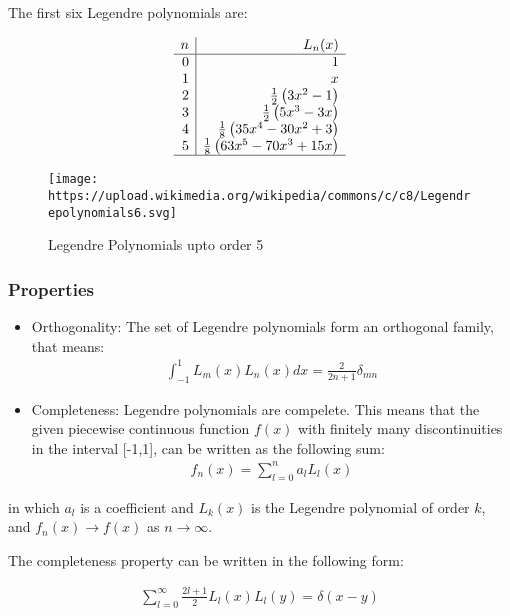 \documentclass[
  a4paper,
  10pt]{article}
\begin{document}
The first six Legendre polynomials are:

\[
\begin{array}{r|r}
 n & L_n(x) \\
\hline
 0 & 1 \\ 
 1 & x \\
 2 & \tfrac12 \left(3x^2-1\right) \\
 3 & \tfrac12 \left(5x^3-3x\right) \\
 4 & \tfrac18 \left(35x^4-30x^2+3\right) \\
 5 & \tfrac18 \left(63x^5-70x^3+15x\right) \\
\hline
\end{array}
\]

\begin{figure}
\centering
\texttt{[image: https://upload.wikimedia.org/wikipedia/commons/c/c8/Legendrepolynomials6.svg]}
\caption{Legendre Polynomials upto order 5}
\end{figure}

\hypertarget{properties}{%
\subsubsection{Properties}\label{properties}}

\begin{itemize}
\item
  Orthogonality: The set of Legendre polynomials form an orthogonal
  family, that means: \begin{align}
  \int_{-1}^1 L_m(x)L_n(x) dx = \frac{2}{2n+1}\delta_{mn} 
  \end{align}
\item
  Completeness: Legendre polynomials are compelete. This means that the
  given piecewise continuous function \(f(x)\) with finitely many
  discontinuities in the interval {[}-1,1{]}, can be written as the
  following sum: \begin{align}
  f_n(x)=\sum_{l=0}^{n}a_lL_l(x)
  \end{align}
\end{itemize}

in which \(a_l\) is a coefficient and \(L_k(x)\) is the Legendre
polynomial of order \(k\), and \(f_n(x) \to f(x)\) as \(n \to \infty\).

The completeness property can be written in the following form:

\begin{align}
\sum_{l=0}^{\infty}\frac{2l+1}{2}L_l(x)L_l(y) = \delta(x-y)
\end{align}
\end{document}
